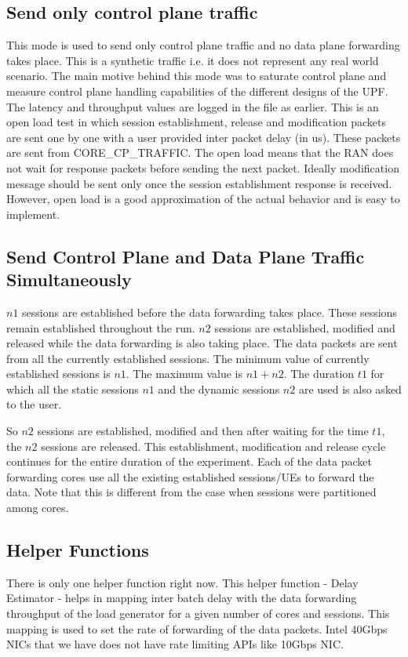 \documentclass{article}
\begin{document}
\subsection{Send only control plane traffic}
This mode is used to send only control plane traffic and no data plane forwarding takes place.
This is a synthetic traffic i.e. it does not represent any real world scenario. The main motive behind this mode was to saturate control plane and measure control plane handling capabilities of the different designs of the UPF. The latency and throughput values are logged in the file as earlier.
This is an open load test in which session establishment, release and modification packets are sent one by one with a user provided inter packet delay (in us). These packets are sent from CORE\_CP\_TRAFFIC. The open load means that the RAN does not wait for response packets before sending
 the next packet.  Ideally modification message should be sent only once the session establishment response is received. However, open load is a good approximation of the actual behavior and is easy to implement.
 
\subsection{Send Control Plane and Data Plane Traffic Simultaneously}
$n1$ sessions are established before the data forwarding takes place. These sessions remain established throughout the run.
$n2$ sessions are established, modified and released while the data forwarding is also taking place. The data packets are sent from all the currently established sessions. The minimum value of currently established sessions is $n1$. The maximum value is $n1+n2$.
The duration $t1$ for which all the static sessions $n1$ and the dynamic sessions $n2$ are used is also asked to the user. 

So $n2$ sessions are established, modified and then after waiting for the time $t1$, the $n2$ sessions are released. This establishment, modification and release cycle continues for the entire duration of the experiment.
Each of the data packet forwarding cores use all the existing established sessions/UEs to forward the data. Note that this is different from the case when sessions were partitioned among cores.
\subsection{Helper Functions}
There is only one helper function right now. This helper function - Delay Estimator - helps in mapping inter batch delay with the data forwarding throughput of the load generator for a given number of cores and sessions. 
This mapping is used to set the rate of forwarding of the data packets. Intel 40Gbps NICs that we have does not have rate limiting APIs like 10Gbps NIC.
\end{document}

